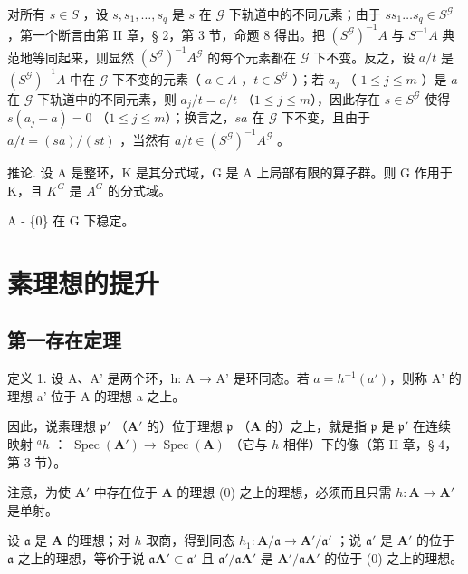 对所有 \(s \in S\) ，设 \(s, s_1, \ldots, s_q\) 是 \(s\) 在 \(\mathcal{G}\) 下轨道中的不同元素；由于 \(ss_1 \ldots s_q \in S^{\mathcal{G}}\) ，第一个断言由第 II 章，§ 2，第 3 节，命题 8 得出。把 \((S^{\mathcal{G}})^{-1}A\) 与 \(S^{-1}A\) 典范地等同起来，则显然 \((S^{\mathcal{G}})^{-1}A^{\mathcal{G}}\) 的每个元素都在 \(\mathcal{G}\) 下不变。反之，设 \(a/t\) 是 \((S^{\mathcal{G}})^{-1}A\) 中在 \(\mathcal{G}\) 下不变的元素（ \(a \in A\) ，\(t \in S^{\mathcal{G}}\) ）；若 \(a_j\) （ \(1 \leqslant j \leqslant m\) ）是 \(a\) 在 \(\mathcal{G}\) 下轨道中的不同元素，则 \(a_j/t = a/t\) （\(1 \leqslant j \leqslant m\)），因此存在 \(s \in S^{\mathcal{G}}\) 使得 \(s(a_j - a) = 0\) （\(1 \leqslant j \leqslant m\)）；换言之，\(sa\) 在 \(\mathcal{G}\) 下不变，且由于 \(a/t = (sa)/(st)\) ，当然有 \(a/t \in (S^{\mathcal{G}})^{-1}A^{\mathcal{G}}\) 。

推论. 设 A 是整环，K 是其分式域，G 是 A 上局部有限的算子群。则 G 作用于 K，且 \(K^{G}\) 是 \(A^{G}\) 的分式域。

A - \{0\} 在 G 下稳定。

\section{素理想的提升}

\subsection{第一存在定理}

定义 1. 设 A、A' 是两个环，h: A → A' 是环同态。若 \(a = h^{-1}(a')\)，则称 A' 的理想 a' 位于 A 的理想 a 之上。

因此，说素理想 \(\mathfrak{p}'\) （\(\mathbf{A}'\) 的）位于理想 \(\mathfrak{p}\) （\(\mathbf{A}\) 的）之上，就是指 \(\mathfrak{p}\) 是 \(\mathfrak{p}'\) 在连续映射 \(^a h\) ： \(\operatorname{Spec}(\mathbf{A}') \to \operatorname{Spec}(\mathbf{A})\) （它与 \(h\) 相伴）下的像（第 II 章，§ 4，第 3 节）。

注意，为使 \(\mathbf{A}'\) 中存在位于 \(\mathbf{A}\) 的理想 (0) 之上的理想，必须而且只需 \(h: \mathbf{A} \to \mathbf{A}'\) 是单射。

设 \(\mathfrak{a}\) 是 \(\mathbf{A}\) 的理想；对 \(h\) 取商，得到同态 \(h_1: \mathbf{A} / \mathfrak{a} \to \mathbf{A}' / \mathfrak{a}'\) ；说 \(\mathfrak{a}'\) 是 \(\mathbf{A}'\) 的位于 \(\mathfrak{a}\) 之上的理想，等价于说 \(\mathfrak{a}\mathbf{A}' \subset \mathfrak{a}'\) 且 \(\mathfrak{a}' / \mathfrak{a}\mathbf{A}'\) 是 \(\mathbf{A}' / \mathfrak{a}\mathbf{A}'\) 的位于 (0) 之上的理想。

